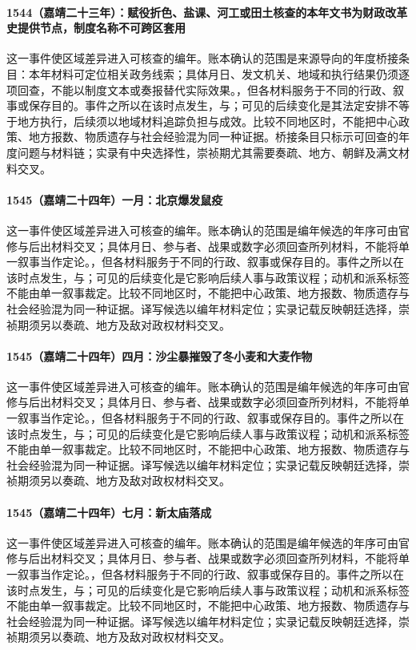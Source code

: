 \paragraph{1544（嘉靖二十三年）：赋役折色、盐课、河工或田土核查的本年文书为财政改革史提供节点，制度名称不可跨区套用} 这一事件使区域差异进入可核查的编年。账本确认的范围是来源导向的年度桥接条目：本年材料可定位相关政务线索；具体月日、发文机关、地域和执行结果仍须逐项回查，不能以制度文本或奏报替代实际效果。，但各材料服务于不同的行政、叙事或保存目的。事件之所以在该时点发生，与；可见的后续变化是其法定安排不等于地方执行，后续须以地域材料追踪负担与成效。比较不同地区时，不能把中心政策、地方报数、物质遗存与社会经验混为同一种证据。桥接条目只标示可回查的年度问题与材料链；实录有中央选择性，崇祯期尤其需要奏疏、地方、朝鲜及满文材料交叉。

\paragraph{1545（嘉靖二十四年）一月：北京爆发鼠疫} 这一事件使区域差异进入可核查的编年。账本确认的范围是编年候选的年序可由官修与后出材料交叉；具体月日、参与者、战果或数字必须回查所列材料，不能将单一叙事当作定论。，但各材料服务于不同的行政、叙事或保存目的。事件之所以在该时点发生，与；可见的后续变化是它影响后续人事与政策议程；动机和派系标签不能由单一叙事裁定。比较不同地区时，不能把中心政策、地方报数、物质遗存与社会经验混为同一种证据。译写候选以编年材料定位；实录记载反映朝廷选择，崇祯期须另以奏疏、地方及敌对政权材料交叉。

\paragraph{1545（嘉靖二十四年）四月：沙尘暴摧毁了冬小麦和大麦作物} 这一事件使区域差异进入可核查的编年。账本确认的范围是编年候选的年序可由官修与后出材料交叉；具体月日、参与者、战果或数字必须回查所列材料，不能将单一叙事当作定论。，但各材料服务于不同的行政、叙事或保存目的。事件之所以在该时点发生，与；可见的后续变化是它影响后续人事与政策议程；动机和派系标签不能由单一叙事裁定。比较不同地区时，不能把中心政策、地方报数、物质遗存与社会经验混为同一种证据。译写候选以编年材料定位；实录记载反映朝廷选择，崇祯期须另以奏疏、地方及敌对政权材料交叉。

\paragraph{1545（嘉靖二十四年）七月：新太庙落成} 这一事件使区域差异进入可核查的编年。账本确认的范围是编年候选的年序可由官修与后出材料交叉；具体月日、参与者、战果或数字必须回查所列材料，不能将单一叙事当作定论。，但各材料服务于不同的行政、叙事或保存目的。事件之所以在该时点发生，与；可见的后续变化是它影响后续人事与政策议程；动机和派系标签不能由单一叙事裁定。比较不同地区时，不能把中心政策、地方报数、物质遗存与社会经验混为同一种证据。译写候选以编年材料定位；实录记载反映朝廷选择，崇祯期须另以奏疏、地方及敌对政权材料交叉。


